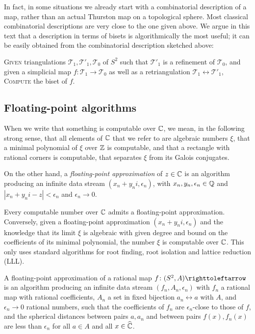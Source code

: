 \documentclass{amsart}
\begin{document}
In fact, in some situations we already start with a combinatorial
description of a map, rather than an actual Thurston map on a
topological sphere. Most classical combinatorial descriptions are very
close to the one given above. We argue in this text that a description
in terms of bisets is algorithmically the most useful; it can be
easily obtained from the combinatorial description sketched above:
\begin{algo}\label{algo:tri2biset}
  \textsc{Given} triangulations $\mathcal T_1,\mathcal T'_1,\mathcal T_0$ of $S^2$ such that $\mathcal T'_1$ is a refinement of $\mathcal T_0$, and given a simplicial map $f\colon\mathcal T_1\rightarrow\mathcal T_0$ as well as a retriangulation $\mathcal T_1\leftrightarrow \mathcal T'_1$,\\
  \textsc{Compute} the biset of $f$.
\end{algo}

\subsection{Floating-point algorithms}
When we write that something is computable over ${\mathbb C}$, we mean, in the
following strong sense, that all elements of ${\mathbb C}$ that we refer to are
algebraic numbers $\xi$, that a minimal polynomial of $\xi$ over ${\mathbb Z}$
is computable, and that a rectangle with rational corners is
computable, that separates $\xi$ from its Galois conjugates.

On the other hand, a \emph{floating-point approximation} of $z\in{\mathbb C}$
is an algorithm producing an infinite data stream
$(x_n+y_n i,\epsilon_n)$, with $x_n,y_n,\epsilon_n\in{\mathbb Q}$ and
$|x_n+y_n i-z|<\epsilon_n$ and $\epsilon_n\to 0$.

Every computable number over ${\mathbb C}$ admits a floating-point
approximation. Conversely, given a floating-point approximation
$(x_n+y_n i,\epsilon_n)$ and the knowledge that its limit $\xi$ is
algebraic with given degree and bound on the coefficients of its
minimal polynomial, the number $\xi$ is computable over ${\mathbb C}$. This
only uses standard algorithms for root finding, root isolation and
lattice reduction (LLL).

A floating-point approximation of a rational map
$f\colon (S^2,A)\selfmap$ is an algorithm producing an infinite data
stream $(f_n,A_n,\epsilon_n)$ with $f_n$ a rational map with rational
coefficients, $A_n$ a set in fixed bijection $a_n\leftrightarrow a$
with $A$, and $\epsilon_n\to0$ rational numbers, such that the
coefficients of $f_n$ are $\epsilon_n$-close to those of $f$, and the
spherical distances between pairs $a,a_n$ and between pairs
$f(x),f_n(x)$ are less than $\epsilon_n$ for all $a\in A$ and all
$x\in \widehat{{\mathbb C}}$.
\end{document}
